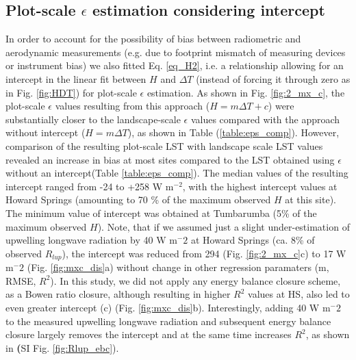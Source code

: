 \documentclass[fleqn,10pt]{wlscirep}
\begin{document}
\subsection{Plot-scale $\epsilon$ estimation considering intercept}
In order to account for the possibility of bias between radiometric and aerodynamic measurements (e.g. due to footprint mismatch of measuring devices or instrument bias) we also fitted Eq. \ref{eq_H2}, i.e. a relationship allowing for an intercept in the linear fit between $H$ and $\Delta T$ (instead of forcing it through zero as in Fig. \ref{fig:HDT}) for plot-scale $\epsilon$ estimation. As shown in Fig. \ref{fig:2_mx_c}, the plot-scale $\epsilon$ values resulting from this approach ($H=m \Delta T + c$) were substantially closer to the landscape-scale $\epsilon$ values compared with the approach without intercept ($H=m \Delta T$), as shown in Table (\ref{table:eps_comp}). However, comparison of the resulting plot-scale LST with landscape scale LST values revealed an increase in bias at most sites compared to the LST obtained using $\epsilon$ without an intercept(Table \ref{table:eps_comp}). The median values of the resulting intercept ranged from -24 to +258 W m$^{-2}$, with the highest intercept values at Howard Springs (amounting to 70 \% of the maximum observed $H$ at this site). The minimum value of intercept was obtained at Tumbarumba (5\% of the maximum observed $H$). 
Note, that if we assumed just a slight under-estimation of upwelling longwave radiation by 40 W m$^-{2}$ at Howard Springs (ca. 8\% of observed $R_{lup}$), the intercept was reduced from 294 (Fig. \ref{fig:2_mx_c}c) to 17  W m$^-{2}$ (Fig. \ref{fig:mxc_dis}a) without change in other regression paramaters (m, RMSE, $R^{2}$). In this study, we did not apply any energy balance closure scheme, as a Bowen ratio closure, although resulting in higher $R^2$ values at HS, also led to even greater intercept (c) (Fig. \ref{fig:mxc_dis}b). 
Interestingly, adding 40 W m$^-{2}$ to the  measured upwelling longwave radiation and subsequent energy balance closure largely removes the intercept and at the same time increases $R^2$, as shown in \textbf(SI Fig. \ref{fig:Rlup_ebc}). %
\end{document}
